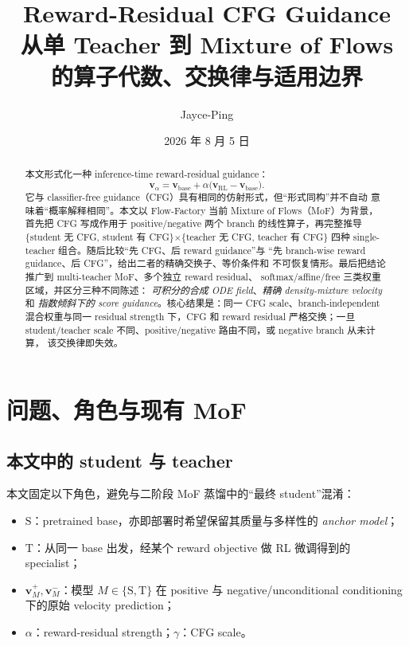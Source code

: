 \documentclass[11pt,a4paper]{article}
\title{\textbf{Reward-Residual CFG Guidance}\\[0.35em]
\large 从单 Teacher 到 Mixture of Flows 的算子代数、交换律与适用边界}
\author{Jayce-Ping}
\date{2026 年 8 月 5 日}
\newcommand{\vfield}{\bm{v}}
\newcommand{\base}{\mathrm{base}}
\newcommand{\rl}{\mathrm{RL}}
\newcommand{\student}{\mathrm{S}}
\newcommand{\teacher}{\mathrm{T}}
\newcommand{\pos}{+}
\newcommand{\negbranch}{-}
\theoremstyle{definition}
\theoremstyle{plain}
\begin{document}
\maketitle

\begin{abstract}
本文形式化一种 inference-time reward-residual guidance：
\[
  \vfield_{\alpha}
  =
  \vfield_{\base}
  +\alpha\bigl(\vfield_{\rl}-\vfield_{\base}\bigr).
\]
它与 classifier-free guidance（CFG）具有相同的仿射形式，但``形式同构''并不自动
意味着``概率解释相同''。本文以 Flow-Factory 当前 Mixture of Flows（MoF）为背景，
首先把 CFG 写成作用于 positive/negative 两个 branch 的线性算子，再完整推导
\{student 无 CFG, student 有 CFG\}$\times$\{teacher 无 CFG, teacher 有 CFG\}
四种 single-teacher 组合。随后比较``先 CFG、后 reward guidance''与
``先 branch-wise reward guidance、后 CFG''，给出二者的精确交换子、等价条件和
不可恢复情形。最后把结论推广到 multi-teacher MoF、多个独立 reward residual、
softmax/affine/free 三类权重区域，并区分三种不同陈述：
\emph{可积分的合成 ODE field}、\emph{精确 density-mixture velocity} 和
\emph{指数倾斜下的 score guidance}。核心结果是：同一 CFG scale、branch-independent
混合权重与同一 residual strength 下，CFG 和 reward residual 严格交换；一旦
student/teacher scale 不同、positive/negative 路由不同，或 negative branch 从未计算，
该交换律即失效。
\end{abstract}

\tableofcontents
\newpage

\section{问题、角色与现有 MoF}

\subsection{本文中的 student 与 teacher}

本文固定以下角色，避免与二阶段 MoF 蒸馏中的``最终 student''混淆：
\begin{itemize}[leftmargin=1.6em]
  \item $\student$：pretrained base，亦即部署时希望保留其质量与多样性的
  \emph{anchor model}；
  \item $\teacher$：从同一 base 出发，经某个 reward objective 做 RL 微调得到的
  specialist；
  \item $\vfield_M^\pos,\vfield_M^\negbranch$：模型
  $M\in\{\student,\teacher\}$ 在 positive 与 negative/unconditional conditioning
  下的原始 velocity prediction；
  \item $\alpha$：reward-residual strength；$\gamma$：CFG scale。
\end{itemize}
\end{document}
